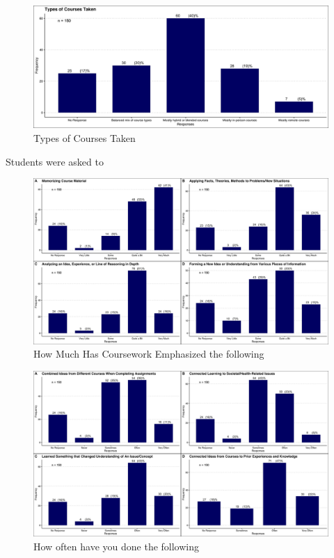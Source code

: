 \documentclass{article}
\begin{document}
\begin{figure}[H]
	\includegraphics[width=\textwidth]{figures_4f06/types_of_courses_taken.jpg}
	\caption{Types of Courses Taken}
	\label{fig:2}
\end{figure}

Students were asked to 

\begin{figure}[H]
	\includegraphics[width=\textwidth]{figures_4f06/howmuch_coursework_emphasized_thefollowing.jpg}
	\caption{How Much Has Coursework Emphasized the following}
	\label{fig:3}
\end{figure}

\begin{figure}[H]
	\includegraphics[width=\textwidth]{figures_4f06/how_often_haveyou_done_thefollowing.jpg}
	\caption{How often have you done the following}
	\label{fig:4}
\end{figure}
\end{document}

